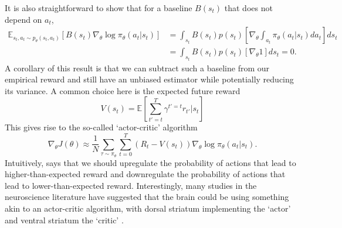 It is also straightforward to show that for a baseline $B(s_t)$ that does not depend on $a_t$,
\begin{align}
    \mathbb{E}_{s_t, a_t \sim p_\theta(s_t, a_t)} \left [ B(s_t) \nabla_\theta \log \pi_\theta (a_t|s_t) \right ]
     & = \int_{s_t} B(s_t) p(s_t) \left [ \nabla_\theta \int_{a_t} \pi_\theta (a_t|s_t) da_t \right ] ds_t \\
     & = \int_{s_t} B(s_t) p(s_t) \left [ \nabla_\theta 1 \right ] ds_t = 0.
\end{align}
A corollary of this result is that we can subtract such a baseline from our empirical reward and still have an unbiased estimator while potentially reducing its variance.
A common choice here is the expected future reward
\begin{equation}
    V(s_t) = \mathbb{E} \left [ \sum_{t' = t}^T \gamma^{t'=t} r_{t'} | s_t \right ]
\end{equation}
This gives rise to the so-called `actor-critic' algorithm
\begin{equation}
    \label{eq:AC}
    \nabla_\theta J(\theta) \approx \frac{1}{N} \sum_{\tau \sim \pi_\theta}  \sum_{t=0}^T (R_t - V(s_t)) \nabla_\theta \log \pi_\theta (a_t|s_t).
\end{equation}
Intuitively,  says that we should upregulate the probability of actions that lead to higher-than-expected reward and downregulate the probability of actions that lead to lower-than-expected reward.
Interestingly, many studies in the neuroscience literature have suggested that the brain could be using something akin to an actor-critic algorithm, with dorsal striatum implementing the `actor' and ventral striatum the `critic' \citep{takahashi2008silencing,sutton2018reinforcement}.

